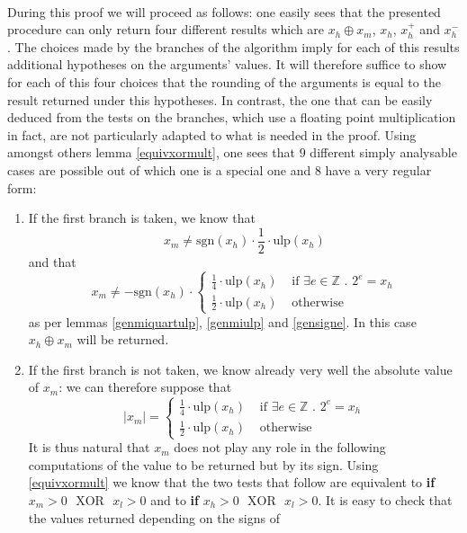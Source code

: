 \documentclass[a4paper,10pt,twoside]{article}
\newenvironment{proof}[1][Proof]{\begin{trivlist}
\item[\hskip \labelsep {\bfseries #1}]}{\end{trivlist}}
\newcommand{\Z}{\ensuremath{\mathbb {Z}}}
\newcommand{\hi}{\ensuremath{\mathit{h}}}
\newcommand{\mi}{\ensuremath{\mathit{m}}}
\newcommand{\lo}{\ensuremath{\mathit{l}}}
\newcommand{\mUlp}{\ensuremath{\mathrm{ulp}}}
\newcommand{\sgn}{\ensuremath{\mathrm{sgn}}}
\newcommand{\xor}{\ensuremath{\mbox{ }\mathrm{XOR}\mbox{ }}}
\begin{document}
\begin{proof} ~ \\
During this proof we will proceed as follows: one easily sees that the presented procedure can only return four
different results which are $x_\hi \oplus x_\mi$, $x_\hi$, $x_\hi^+$ and $x_\hi^-$. 
The choices made by the branches of the algorithm imply for each of this results additional hypotheses on the 
arguments' values. It will therefore suffice to show for each of this four choices that the rounding of the 
arguments is equal to the result returned under this hypotheses. In contrast, the one that can be easily 
deduced from the tests on the branches, which use a floating point multiplication in fact, are not particularly 
adapted to what is needed in the proof. Using amongst others lemma \ref{equivxormult}, one sees that 
$9$ different simply analysable cases are possible out of which one is a special one and $8$ have a very regular form:
\begin{enumerate}
\item If the first branch is taken, we know that
$$x_\mi \not = \sgn\left( x_\hi \right) \cdot \frac{1}{2} \cdot \mUlp \left( x_\hi \right)$$
and that 
$$x_\mi \not = - \sgn\left( x_\hi \right) \cdot \left \lbrace 
\begin{array}{ll} \frac{1}{4} \cdot \mUlp \left( x_\hi \right) & \mbox{ if } \exists e \in \Z \mbox{ . } 2^e = x_\hi \\
                  \frac{1}{2} \cdot \mUlp \left( x_\hi \right) & \mbox{ otherwise} \end{array} \right.$$
as per lemmas \ref{genmiquartulp}, \ref{genmiulp} and \ref{gensigne}.
In this case $x_\hi \oplus x_\mi$ will be returned.
\item If the first branch is not taken, we know already very well the absolute value of $x_\mi$:
we can therefore suppose that
$$\left \vert x_\mi \right \vert = \left \lbrace 
\begin{array}{ll} \frac{1}{4} \cdot \mUlp \left( x_\hi \right) & \mbox{ if } \exists e \in \Z \mbox{ . } 2^e = x_\hi \\
                  \frac{1}{2} \cdot \mUlp \left( x_\hi \right) & \mbox{ otherwise} \end{array} \right.$$
It is thus natural that $x_\mi$ does not play any role in the following computations of the value to be returned but by its
sign.
Using \ref{equivxormult} we know that the two tests that follow are equivalent to  
{{\bf if} $x_\mi > 0 \xor x_\lo > 0$} and to {{\bf if} $x_\hi > 0 \xor x_\lo > 0$}. 
It is easy to check that the values returned depending on the signs of  

\end{enumerate}
\end{proof}
\end{document}
